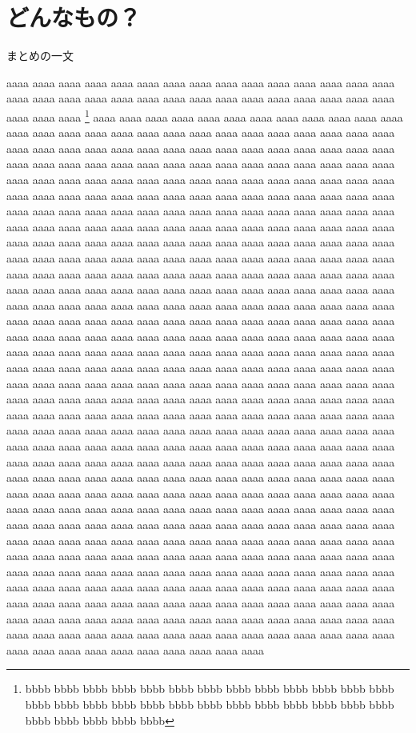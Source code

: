 \documentclass[10pt,dvipdfmx,landscape]{jsarticle}
\begin{document}
\section{どんなもの？}
\begin{screen}
	まとめの一文
\end{screen}
%
aaaa aaaa aaaa aaaa aaaa aaaa aaaa aaaa aaaa aaaa aaaa 
aaaa aaaa aaaa aaaa aaaa aaaa aaaa aaaa aaaa aaaa aaaa 
aaaa aaaa aaaa aaaa aaaa aaaa aaaa aaaa aaaa aaaa aaaa 
\footnote{bbbb bbbb bbbb bbbb bbbb bbbb bbbb bbbb bbbb
bbbb bbbb bbbb bbbb bbbb bbbb bbbb bbbb bbbb bbbb bbbb 
bbbb bbbb bbbb bbbb bbbb bbbb bbbb bbbb bbbb bbbb bbbb} 
aaaa aaaa aaaa aaaa aaaa aaaa aaaa aaaa aaaa aaaa aaaa 
aaaa aaaa aaaa aaaa aaaa aaaa aaaa aaaa aaaa aaaa aaaa 
aaaa aaaa aaaa aaaa aaaa aaaa aaaa aaaa aaaa aaaa aaaa 
aaaa aaaa aaaa aaaa aaaa aaaa aaaa aaaa aaaa aaaa aaaa 
aaaa aaaa aaaa aaaa aaaa aaaa aaaa aaaa aaaa aaaa aaaa 
aaaa aaaa aaaa aaaa aaaa aaaa aaaa aaaa aaaa aaaa aaaa 
aaaa aaaa aaaa aaaa aaaa aaaa aaaa aaaa aaaa aaaa aaaa 
aaaa aaaa aaaa aaaa aaaa aaaa aaaa aaaa aaaa aaaa aaaa 
aaaa aaaa aaaa aaaa aaaa aaaa aaaa aaaa aaaa aaaa aaaa 
aaaa aaaa aaaa aaaa aaaa aaaa aaaa aaaa aaaa aaaa aaaa 
aaaa aaaa aaaa aaaa aaaa aaaa aaaa aaaa aaaa aaaa aaaa 
aaaa aaaa aaaa aaaa aaaa aaaa aaaa aaaa aaaa aaaa aaaa 
aaaa aaaa aaaa aaaa aaaa aaaa aaaa aaaa aaaa aaaa aaaa 
aaaa aaaa aaaa aaaa aaaa aaaa aaaa aaaa aaaa aaaa aaaa 
aaaa aaaa aaaa aaaa aaaa aaaa aaaa aaaa aaaa aaaa aaaa 
aaaa aaaa aaaa aaaa aaaa aaaa aaaa aaaa aaaa aaaa aaaa 
aaaa aaaa aaaa aaaa aaaa aaaa aaaa aaaa aaaa aaaa aaaa 
aaaa aaaa aaaa aaaa aaaa aaaa aaaa aaaa aaaa aaaa aaaa 
aaaa aaaa aaaa aaaa aaaa aaaa aaaa aaaa aaaa aaaa aaaa 
aaaa aaaa aaaa aaaa aaaa aaaa aaaa aaaa aaaa aaaa aaaa 
aaaa aaaa aaaa aaaa aaaa aaaa aaaa aaaa aaaa aaaa aaaa 
aaaa aaaa aaaa aaaa aaaa aaaa aaaa aaaa aaaa aaaa aaaa 
aaaa aaaa aaaa aaaa aaaa aaaa aaaa aaaa aaaa aaaa aaaa 
aaaa aaaa aaaa aaaa aaaa aaaa aaaa aaaa aaaa aaaa aaaa 
aaaa aaaa aaaa aaaa aaaa aaaa aaaa aaaa aaaa aaaa aaaa 
aaaa aaaa aaaa aaaa aaaa aaaa aaaa aaaa aaaa aaaa aaaa 
aaaa aaaa aaaa aaaa aaaa aaaa aaaa aaaa aaaa aaaa aaaa 
aaaa aaaa aaaa aaaa aaaa aaaa aaaa aaaa aaaa aaaa aaaa 
aaaa aaaa aaaa aaaa aaaa aaaa aaaa aaaa aaaa aaaa aaaa 
aaaa aaaa aaaa aaaa aaaa aaaa aaaa aaaa aaaa aaaa aaaa 
aaaa aaaa aaaa aaaa aaaa aaaa aaaa aaaa aaaa aaaa aaaa 
aaaa aaaa aaaa aaaa aaaa aaaa aaaa aaaa aaaa aaaa aaaa 
aaaa aaaa aaaa aaaa aaaa aaaa aaaa aaaa aaaa aaaa aaaa 
aaaa aaaa aaaa aaaa aaaa aaaa aaaa aaaa aaaa aaaa aaaa 
aaaa aaaa aaaa aaaa aaaa aaaa aaaa aaaa aaaa aaaa aaaa 
aaaa aaaa aaaa aaaa aaaa aaaa aaaa aaaa aaaa aaaa aaaa 
aaaa aaaa aaaa aaaa aaaa aaaa aaaa aaaa aaaa aaaa aaaa 
aaaa aaaa aaaa aaaa aaaa aaaa aaaa aaaa aaaa aaaa aaaa 
aaaa aaaa aaaa aaaa aaaa aaaa aaaa aaaa aaaa aaaa aaaa 
aaaa aaaa aaaa aaaa aaaa aaaa aaaa aaaa aaaa aaaa aaaa 
aaaa aaaa aaaa aaaa aaaa aaaa aaaa aaaa aaaa aaaa aaaa 
aaaa aaaa aaaa aaaa aaaa aaaa aaaa aaaa aaaa aaaa aaaa 
aaaa aaaa aaaa aaaa aaaa aaaa aaaa aaaa aaaa aaaa aaaa 
aaaa aaaa aaaa aaaa aaaa aaaa aaaa aaaa aaaa aaaa aaaa 
aaaa aaaa aaaa aaaa aaaa aaaa aaaa aaaa aaaa aaaa aaaa 
aaaa aaaa aaaa aaaa aaaa aaaa aaaa aaaa aaaa aaaa aaaa 
aaaa aaaa aaaa aaaa aaaa aaaa aaaa aaaa aaaa aaaa aaaa 
\end{document}
